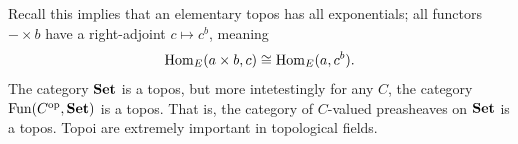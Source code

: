 Recall this implies that an elementary topos has all exponentials; all functors $-\times b$ have a right-adjoint $c\mapsto c^b$, meaning
\[
	\operatorname{Hom}_{E}(a\times b, c) \cong \operatorname{Hom}_{E}(a, c^b) 
.\]
The category $\mathbf{Set} $ is a topos, but more intetestingly for any $C$, the category $\operatorname{Fun}(C^{\mathrm{op} } ,\mathbf{Set} )$ is a topos. That is, the category of $C$-valued preasheaves on $\mathbf{Set} $ is a topos. Topoi are extremely important in topological fields.
